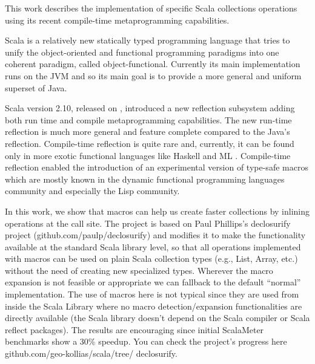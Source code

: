 This work describes the implementation of specific Scala collections operations
 using its recent compile-time metaprogramming capabilities.

Scala  is a relatively new statically typed programming language
that tries to unify the object-oriented and functional programming paradigms
into one coherent paradigm, called object-functional. Currently its main
implementation runs on the JVM and so its main goal is to provide a more
general and uniform superset of Java.

Scala version 2.10, released on , introduced a new reflection
subsystem adding both run time and compile metaprogramming capabilities. The new
run-time reflection is much more general and feature complete compared to the
Java's reflection. Compile-time reflection is quite rare and, currently, it can
be found only in more exotic functional languages like Haskell  and ML . Compile-time reflection enabled
the introduction of an experimental version of type-safe  macros
 which are mostly known
in the dynamic functional programming languages community and especially the
Lisp community.

In this work, we show that macros can help us create faster collections by
inlining operations at the call site. The project is based
on Paul Phillips's declosurify project (github.com/paulp/declosurify) and
modifies it to make the functionality available at the standard Scala library
level, so that all operations implemented with macros can be used on plain Scala
collection types (e.g., List, Array, etc.) without the need of creating new
specialized types. Wherever the macro expansion is not feasible or appropriate
we can fallback to the default ``normal'' implementation. The use of macros
here is not typical since they are used from inside the Scala Library where no
macro detection/expansion functionalities are directly available (the Scala
library doesn't depend on the Scala compiler or Scala reflect packages). The
results are encouraging since initial ScalaMeter benchmarks show a 30\% speedup.
You can check the project's progress here github.com/geo-kollias/scala/tree/
declosurify.
